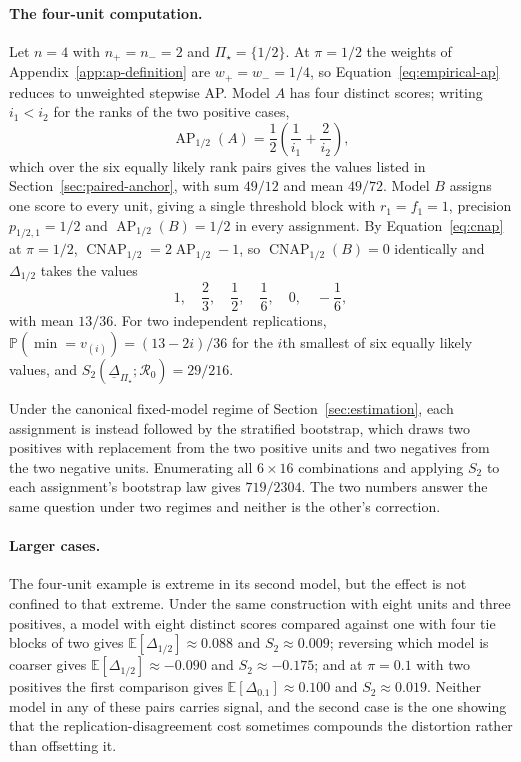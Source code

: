 \documentclass[11pt]{article}
\newcommand{\AP}{\operatorname{AP}}
\newcommand{\CNAP}{\operatorname{CNAP}}
\newcommand{\Regime}{\mathcal{R}}
\newcommand{\PSet}{\Pi_\star}
\newcommand{\E}{\mathbb{E}}
\newcommand{\Prb}{\mathbb{P}}
\newcommand{\RobDelta}{\underline{\Delta}_{\PSet}}
\theoremstyle{remark}
\begin{document}
\paragraph{The four-unit computation.}
Let $n=4$ with $n_+=n_-=2$ and $\PSet=\{1/2\}$. At $\pi=1/2$ the weights of Appendix~\ref{app:ap-definition} are $w_+=w_-=1/4$, so Equation~\eqref{eq:empirical-ap} reduces to unweighted stepwise AP. Model $A$ has four distinct scores; writing $i_1<i_2$ for the ranks of the two positive cases,
\[
\AP_{1/2}(A)
=
\frac12
\left(
\frac{1}{i_1}+\frac{2}{i_2}
\right),
\]
which over the six equally likely rank pairs gives the values listed in Section~\ref{sec:paired-anchor}, with sum $49/12$ and mean $49/72$. Model $B$ assigns one score to every unit, giving a single threshold block with $r_1=f_1=1$, precision $p_{1/2,1}=1/2$ and $\AP_{1/2}(B)=1/2$ in every assignment. By Equation~\eqref{eq:cnap} at $\pi=1/2$, $\CNAP_{1/2}=2\AP_{1/2}-1$, so $\CNAP_{1/2}(B)=0$ identically and $\Delta_{1/2}$ takes the values
\[
1,\quad
\frac23,\quad
\frac12,\quad
\frac16,\quad
0,\quad
-\frac16 ,
\]
with mean $13/36$. For two independent replications, $\Prb(\min=v_{(i)})=(13-2i)/36$ for the $i$th smallest of six equally likely values, and $S_2(\RobDelta;\Regime_0)=29/216$.

Under the canonical fixed-model regime of Section~\ref{sec:estimation}, each assignment is instead followed by the stratified bootstrap, which draws two positives with replacement from the two positive units and two negatives from the two negative units. Enumerating all $6\times16$ combinations and applying $S_2$ to each assignment's bootstrap law gives $719/2304$. The two numbers answer the same question under two regimes and neither is the other's correction.

\paragraph{Larger cases.}
The four-unit example is extreme in its second model, but the effect is not confined to that extreme. Under the same construction with eight units and three positives, a model with eight distinct scores compared against one with four tie blocks of two gives $\E[\Delta_{1/2}]\approx0.088$ and $S_2\approx0.009$; reversing which model is coarser gives $\E[\Delta_{1/2}]\approx-0.090$ and $S_2\approx-0.175$; and at $\pi=0.1$ with two positives the first comparison gives $\E[\Delta_{0.1}]\approx0.100$ and $S_2\approx0.019$. Neither model in any of these pairs carries signal, and the second case is the one showing that the replication-disagreement cost sometimes compounds the distortion rather than offsetting it.
\end{document}
